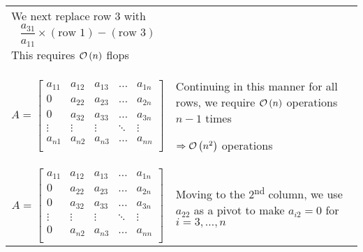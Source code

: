 \begin{center}
\begin{tabular}{p{6cm}p{6cm}}
        \vspace{1em}
We next replace row 3 with
\begin{equation*}
    \frac{a_{31}}{a_{11}} \times (\text{row 1}) - (\text{row 3})
\end{equation*}
This requires $\mathcal{O}\left(n\right)$ flops                     \\
\begin{equation*}
    A = 
    \begin{bmatrix}  
        a_{11} & a_{12} & a_{13} & \ldots & a_{1n} \\
        0      & a_{22} & a_{23} & \ldots & a_{2n} \\
        0      & a_{32} & a_{33} & \ldots & a_{3n} \\
        \vdots & \vdots & \vdots & \ddots & \vdots \\
        a_{n1} & a_{n2} & a_{n3} & \ldots & a_{nn} \\
    \end{bmatrix}  
\end{equation*}
               & 
        \vspace{1em}
Continuing in this manner for all rows,
        we require $\mathcal{O}\left(n\right)$ operations $n-1$ times
        \begin{displayquote}
            $\Rightarrow \mathcal{O}\left(n^2\right)$ operations 
        \end{displayquote}
                                                   \\
\begin{equation*}
    A = 
    \begin{bmatrix}  
        a_{11} & a_{12} & a_{13} & \ldots & a_{1n} \\
        0      & a_{22} & a_{23} & \ldots & a_{2n} \\
        0      & a_{32} & a_{33} & \ldots & a_{3n} \\
        \vdots & \vdots & \vdots & \ddots & \vdots \\
        0      & a_{n2} & a_{n3} & \ldots & a_{nn} \\
    \end{bmatrix}  
\end{equation*}
               & 
        \vspace{1em}
        Moving to the 2\textsuperscript{nd} column, we use $a_{22}$ as a pivot to make $a_{i2}=0$
        for $i=3, \ldots, n$
    \end{tabular}
\end{center}


